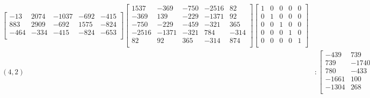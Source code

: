 \documentclass[12pt]{amsart}
\theoremstyle{plain}
\theoremstyle{definition}
\begin{document}
\begin{landscape}
\begin{align*}
\begin{bmatrix}
 -13  &   2074  &   -1037  &   -692  &   -415  \\ 
 883  &   2909  &   -692  &   1575  &   -824  \\ 
 -464  &   -334  &   -415  &   -824  &   -653  \\ 
\end{bmatrix}
\begin{bmatrix}
1537  &   -369  &   -750  &   -2516  &   82  \\ 
 -369  &   139  &   -229  &   -1371  &   92  \\ 
 -750  &   -229  &   -459  &   -321  &   365  \\ 
 -2516  &   -1371  &   -321  &   784  &   -314  \\ 
 82  &   92  &   365  &   -314  &   874  \\ 
\end{bmatrix}
\begin{bmatrix}
1  &   0  &   0  &   0  &   0  \\ 
 0  &   1  &   0  &   0  &   0  \\ 
 0  &   0  &   1  &   0  &   0  \\ 
 0  &   0  &   0  &   1  &   0  \\ 
 0  &   0  &   0  &   0  &   1  \\ 
\end{bmatrix}
\\
(4,2) &:
\begin{bmatrix}
-439  &   739  &   780  &   -1661  &   -1304  \\ 
 739  &   -1740  &   -433  &   100  &   268  \\ 
 780  &   -433  &   -54  &   -49  &   370  \\ 
 -1661  &   100  &   -49  &   1197  &   -590  \\ 
 -1304  &   268  &   370  &   -590  &   263  \\ 
\end{bmatrix}
\begin{bmatrix}
-1986  &   -628  &   1085  &   -1063  &   541  \\ 
 -628  &   287  &   -1556  &   1466  &   -715  \\ 
 1085  &   -1556  &   -270  &   -178  &   -942  \\ 
 -1063  &   1466  &   -178  &   -1528  &   1253  \\ 
 541  &   -715  &   -942  &   1253  &   -183  \\ 
\end{bmatrix}
\begin{bmatrix}

\end{bmatrix}
\end{align*}
\end{landscape}
\end{document}
